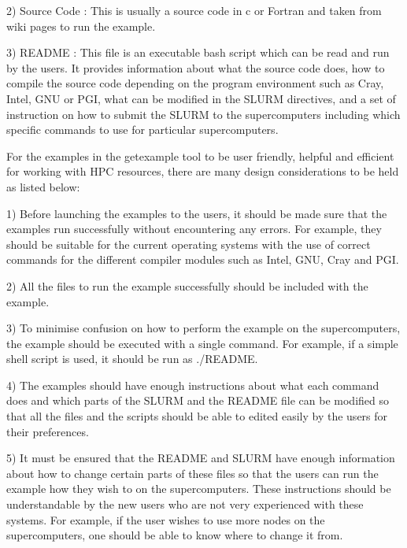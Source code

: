 \begin{Document}
{2) Source Code : This is usually a source code in c or Fortran and taken from wiki pages to run the example.

3) README : This file is an executable bash script which can be read and run by the users. It provides information about what the source code does,
how to compile the source code depending on the program environment such as Cray, Intel, GNU or PGI, what can be modified in the SLURM directives, and 
a set of instruction on how to submit the SLURM to the supercomputers including which specific commands to use for particular supercomputers.

For the examples in the getexample tool to be user friendly, helpful and efficient for working with HPC resources, there are many design considerations 
to be held as listed below:

1) Before launching the examples to the users, it should be made sure that the examples run successfully without encountering any errors. For example,
they should be suitable for the current operating systems with the use of correct commands for the different compiler modules such as Intel, GNU, Cray
and PGI. 

2) All the files to run the example successfully should be included with the example.

3) To minimise confusion on how to perform the example on the supercomputers, the example should be executed with a single command. For example, 
if a simple shell script is used, it should be run as ./README.

4) The examples should have enough instructions about what each command does and which parts of the SLURM and the README file can be modified so that
all the files and the scripts should be able to edited easily by the users for their preferences.

5) It must be ensured that the README and SLURM have enough information about how to change certain parts of these files so that the users can run the 
example how they wish to on the supercomputers. These instructions should be understandable by the new users who are not very experienced with these
systems. For example, if the user wishes to use more nodes on the supercomputers, one should be able to know where to change it from.
 




}
\end{Document}
